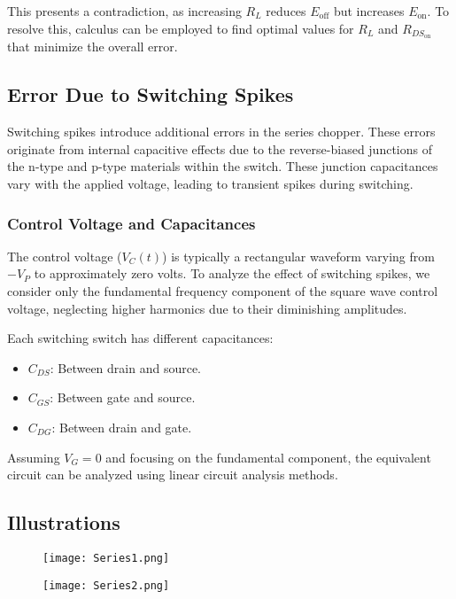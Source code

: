 \documentclass[a4paper,9pt,twoside,openany,twocolumn]{memoir}
\begin{document}
This presents a contradiction, as increasing \( R_L \) reduces \( E_{\text{off}} \) but increases \( E_{\text{on}} \). To resolve this, calculus can be employed to find optimal values for \( R_L \) and \( R_{DS_{\text{on}}} \) that minimize the overall error.

\subsection{Error Due to Switching Spikes}
Switching spikes introduce additional errors in the series chopper. These errors originate from internal capacitive effects due to the reverse-biased junctions of the n-type and p-type materials within the switch. These junction capacitances vary with the applied voltage, leading to transient spikes during switching.

\subsubsection{Control Voltage and Capacitances}
The control voltage (\( V_C(t) \)) is typically a rectangular waveform varying from \(-V_P\) to approximately zero volts. To analyze the effect of switching spikes, we consider only the fundamental frequency component of the square wave control voltage, neglecting higher harmonics due to their diminishing amplitudes.

Each switching switch has different capacitances:
\begin{itemize}
    \item \( C_{DS} \): Between drain and source.
    \item \( C_{GS} \): Between gate and source.
    \item \( C_{DG} \): Between drain and gate.
\end{itemize}

Assuming \( V_G = 0 \) and focusing on the fundamental component, the equivalent circuit can be analyzed using linear circuit analysis methods.
\subsection{Illustrations}


\begin{figure}[H]
    \centering
    \texttt{[image: Series1.png]}
\end{figure}

\begin{figure}[H]
    \centering
    \texttt{[image: Series2.png]}
\end{figure}
\end{document}
